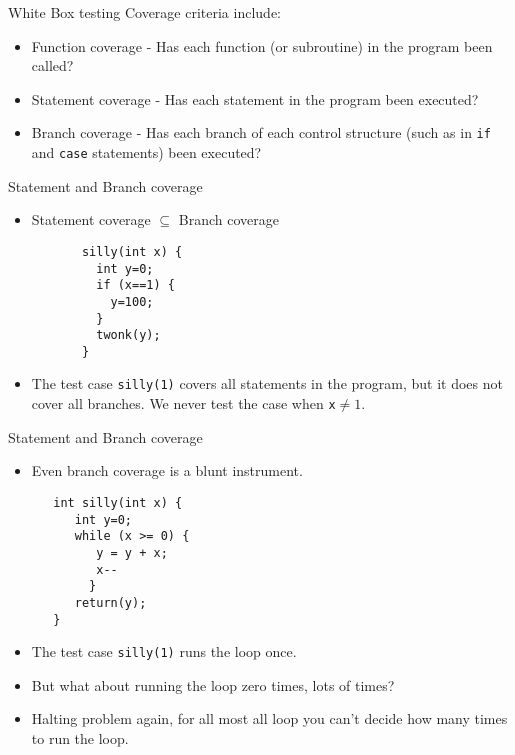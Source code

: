\documentclass{beamer}
\begin{document}
\begin{frame}{White Box testing}
Coverage criteria include:
  \begin{itemize}
  \item Function coverage - Has each function (or subroutine) in the
    program been called?
  \item Statement coverage - Has each statement in the program been
    executed?  
  \item Branch coverage - Has each branch of each control structure
    (such as in {\tt if} and {\tt case} statements) been executed? 
  \end{itemize}
\end{frame}

\begin{frame}[fragile]{Statement and Branch coverage}

\begin{itemize}
\item Statement coverage $\subseteq$ Branch coverage
\begin{lstlisting}
       silly(int x) {
         int y=0;
         if (x==1) {
           y=100;
         }
         twonk(y);
       }
\end{lstlisting}

  \item  The test case {\tt silly(1)} covers all statements in the program, but
  it does not cover all branches. We never test the case when {\tt x}$\neq1$.
\end{itemize}
\end{frame}

\begin{frame}[fragile]{Statement and Branch coverage}
\begin{itemize}
 \item Even branch coverage is a blunt instrument.
\begin{lstlisting}
   int silly(int x) { 
      int y=0;
      while (x >= 0) {
         y = y + x;
         x--
        }
      return(y);
   }
\end{lstlisting}
  \item The test case {\tt silly(1)} runs the loop once.
  \item But what about running the loop zero times, lots of times?
   \item Halting problem again, for all most all loop you can't
     decide how many times to run the loop.
\end{itemize}
    
\end{frame}
\end{document}
